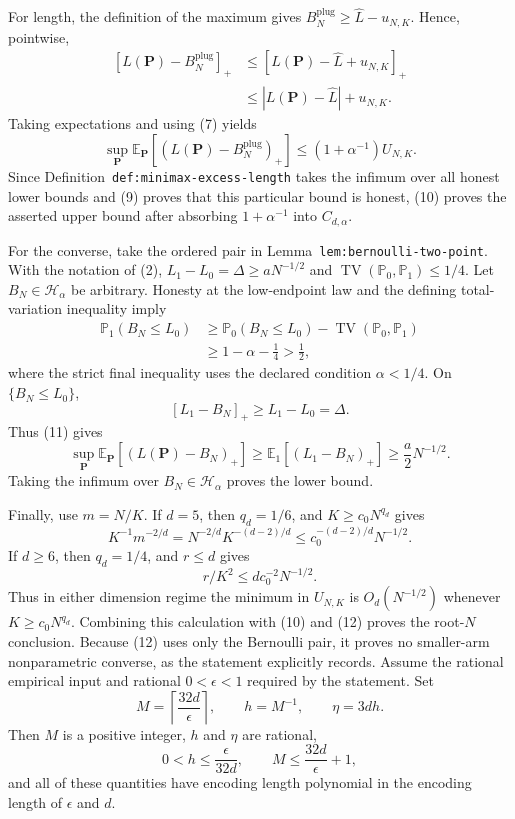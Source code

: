 For length, the definition of the maximum gives \(B_N^{\mathrm{plug}}\ge\widehat L-u_{N,K}\). Hence, pointwise,
\[
\begin{aligned}
[L(\mathbf P)-B_N^{\mathrm{plug}}]_+
&\le[L(\mathbf P)-\widehat L+u_{N,K}]_+\\
&\le|L(\mathbf P)-\widehat L|+u_{N,K}.
\end{aligned}
\]
Taking expectations and using (7) yields
\[
\sup_{\mathbf P}\mathbb E_{\mathbf P}[(L(\mathbf P)-B_N^{\mathrm{plug}})_+]
\le(1+\alpha^{-1})U_{N,K}.
\tag{10}
\]
Since Definition~\texttt{def:minimax-excess-length} takes the infimum over all honest lower bounds and (9) proves that this particular bound is honest, (10) proves the asserted upper bound after absorbing \(1+\alpha^{-1}\) into \(C_{d,\alpha}\).

For the converse, take the ordered pair in Lemma~\texttt{lem:bernoulli-two-point}. With the notation of (2), \(L_1-L_0=\Delta\ge aN^{-1/2}\) and \(\operatorname{TV}(\mathbb P_0,\mathbb P_1)\le1/4\). Let \(B_N\in\mathcal H_\alpha\) be arbitrary. Honesty at the low-endpoint law and the defining total-variation inequality imply
\[
\begin{aligned}
\mathbb P_1(B_N\le L_0)
&\ge \mathbb P_0(B_N\le L_0)-\operatorname{TV}(\mathbb P_0,\mathbb P_1)\\
&\ge1-\alpha-\frac14>\frac12,
\end{aligned}
\tag{11}
\]
where the strict final inequality uses the declared condition \(\alpha<1/4\). On \(\{B_N\le L_0\}\),
\[
[L_1-B_N]_+\ge L_1-L_0=\Delta.
\]
Thus (11) gives
\[
\sup_{\mathbf P}\mathbb E_{\mathbf P}[(L(\mathbf P)-B_N)_+]
\ge\mathbb E_1[(L_1-B_N)_+]
\ge\frac{a}{2}N^{-1/2}.
\tag{12}
\]
Taking the infimum over \(B_N\in\mathcal H_\alpha\) proves the lower bound.

Finally, use \(m=N/K\). If \(d=5\), then \(q_d=1/6\), and \(K\ge c_0N^{q_d}\) gives
\[
K^{-1}m^{-2/d}=N^{-2/d}K^{-(d-2)/d}
\le c_0^{-(d-2)/d}N^{-1/2}.
\]
If \(d\ge6\), then \(q_d=1/4\), and \(r\le d\) gives
\[
r/K^2\le dc_0^{-2}N^{-1/2}.
\]
Thus in either dimension regime the minimum in \(U_{N,K}\) is \(O_d(N^{-1/2})\) whenever \(K\ge c_0N^{q_d}\). Combining this calculation with (10) and (12) proves the root-\(N\) conclusion. Because (12) uses only the Bernoulli pair, it proves no smaller-arm nonparametric converse, as the statement explicitly records.
Assume the rational empirical input and rational \(0<\epsilon<1\) required by the statement. Set
\[
M=\left\lceil\frac{32d}{\epsilon}\right\rceil,
\qquad h=M^{-1},
\qquad \eta=3dh.
\tag{13}
\]
Then \(M\) is a positive integer, \(h\) and \(\eta\) are rational,
\[
0<h\le\frac{\epsilon}{32d},
\qquad
M\le\frac{32d}{\epsilon}+1,
\tag{14}
\]
and all of these quantities have encoding length polynomial in the encoding length of \(\epsilon\) and \(d\).

